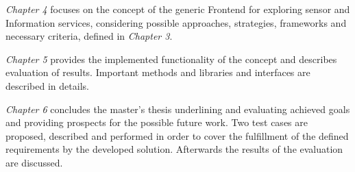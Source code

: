 \emph{Chapter 4} focuses on the concept of the generic Frontend for exploring sensor and Information services, considering possible approaches, strategies, frameworks and necessary criteria, defined in \emph{Chapter 3}.

\emph{Chapter 5} provides the implemented functionality of the concept and describes evaluation of results. Important methods and libraries and interfaces are described in details.

\emph{Chapter 6} concludes the master’s thesis underlining and evaluating achieved goals and providing prospects for the possible future work. Two test cases are proposed, described and performed in order to cover the fulfillment of the defined requirements by the developed solution. Afterwards the results of the evaluation are discussed.
